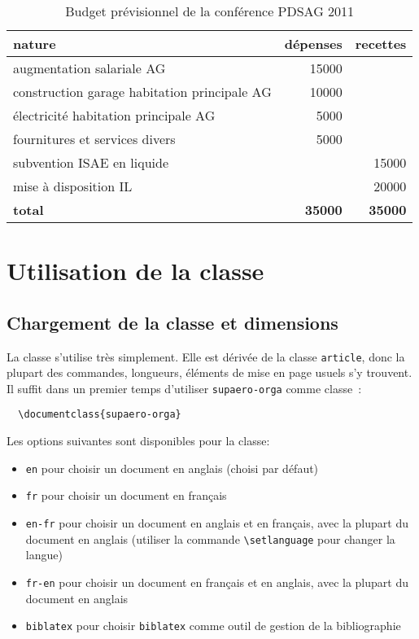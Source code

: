 \documentclass[fr]{supaero-orga}
\begin{document}
\begin{table}[h]
  \centering
  \begin{tabular}[h]{l r r}
    \toprule[1.5pt]
    \textbf{nature} & \textbf{dépenses} & \textbf{recettes}\\
    \midrule
    augmentation salariale AG & 15000 & \\
    construction garage habitation principale AG & 10000\\
    électricité habitation principale AG & 5000\\
    fournitures et services divers & 5000\\
    \midrule
    subvention ISAE en liquide & & 15000\\
    mise à disposition IL & & 20000\\
    \midrule
    \textbf{total} & \textbf{35000} & \textbf{35000}\\
    \bottomrule[1.5pt]
  \end{tabular}
  \caption{Budget prévisionnel de la conférence PDSAG 2011}
  \label{tab:budget}
\end{table}

\section{Utilisation de la classe}
\label{sec:utilisation-de-la}

\subsection{Chargement de la classe et dimensions}
\label{sec:chargement-classe}

La classe s'utilise très simplement. Elle est dérivée de la classe
\texttt{article}, donc la plupart des commandes, longueurs, éléments
de mise en page usuels s'y trouvent. Il suffit dans un premier temps
d'utiliser \texttt{supaero-orga} comme classe~:

\begin{verbatim}
  \documentclass{supaero-orga}
\end{verbatim}

Les options suivantes sont disponibles pour la classe:
\begin{itemize}
\item \verb!en! pour choisir un document en anglais (choisi par
  défaut)
\item \verb!fr! pour choisir un document en français
\item \verb!en-fr! pour choisir un document en anglais et en
  français, avec la plupart du document en anglais (utiliser la
  commande \verb!\setlanguage! pour changer la langue)
\item \verb!fr-en! pour choisir un document en français et en
  anglais, avec la plupart du document en anglais
\item \verb!biblatex! pour choisir \verb!biblatex! comme outil de
  gestion de la bibliographie
\end{itemize}
\end{document}
